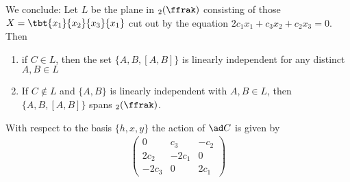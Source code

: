 We conclude: Let $L$ be the plane in $\sl_2(\ffrak)$ consisting of those $X=\tbt{x_1}{x_2}{x_3}{x_1}$ cut out by the equation $2c_1 x_1 + c_3x_2 + c_2x_3 =0$. Then

\begin{enumerate}
    \item if $C \in L$, then the set $\{A,B,[A,B]\}$ is linearly independent for any distinct $A,B \in L$
    \item If $C\not\in L$ and $\{A,B\}$ is linearly independent with $A,B \in L$, then $\{A,B,[A,B]\}$ spans $\sl_2(\ffrak)$.
\end{enumerate}

With respect to the basis $\{h,x,y\}$ the action of $\ad C$ is given by
\begin{align*}
    \left(\begin{array}{ccc}
              0      & c_3    & -c_2  \\
              2 c_2  & -2 c_1 & 0     \\
              -2 c_3 & 0      & 2 c_1
          \end{array}\right)
\end{align*}